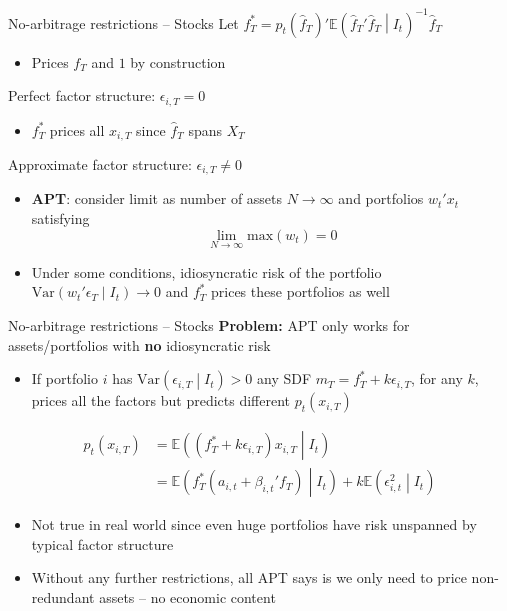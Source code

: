\documentclass[xcolor=table, aspectratio=169]{beamer}
\begin{document}
\begin{frame}{No-arbitrage restrictions -- Stocks}
Let $f_T^* = p_t(\hat{f}_T)' \mathbb{E} \left( \hat{f}_T'\hat{f}_T \middle\vert I_t \right)^{-1} \hat{f}_T$
\begin{itemize}
\item Prices $f_T$ and $1$ by construction
\end{itemize}
\vskip 8pt
Perfect factor structure: $\epsilon_{i,T} = 0$
\begin{itemize}
\item $f_T^*$ prices all $x_{i,T}$ since $\hat{f}_T$ spans $X_T$
\end{itemize}
\vskip 8pt
Approximate factor structure: $\epsilon_{i,T} \neq 0$
\begin{itemize}
\item \textbf{APT}: consider limit as number of assets $N \rightarrow \infty$ and portfolios $w_t'x_t$ satisfying
$$\lim_{N \rightarrow \infty} \text{max}(w_t) = 0$$
\item Under some conditions, idiosyncratic risk of the portfolio $\text{Var} \left( w_t'\epsilon_T  \middle\vert I_t \right) \rightarrow 0$ and $f_T^*$ prices these portfolios as well
\end{itemize}
\end{frame}

\begin{frame}{No-arbitrage restrictions -- Stocks}
\textbf{Problem:} APT only works for assets/portfolios with \textbf{no} idiosyncratic risk
\begin{itemize}
\item If portfolio $i$ has $\text{Var} \left( \epsilon_{i,T} \middle\vert I_t \right) > 0$ any SDF $m_T = f_T^* + k\epsilon_{i,T}$, for any $k$, prices all the factors but predicts different $p_t(x_{i,T})$
\end{itemize}
\begin{align*}
p_t(x_{i,T}) &= \mathbb{E} \left( (f_T^* + k \epsilon_{i,T}) x_{i,T} \middle\vert I_t \right) \\
&= \mathbb{E} \left( f_T^* (a_{i,t} + \beta_{i,t}'f_T) \middle\vert I_t \right) + k \mathbb{E} \left( \epsilon_{i,t}^2 \middle\vert I_t \right)
\end{align*}
\vskip -8pt
\begin{itemize}
\item Not true in real world since even huge portfolios have risk unspanned by typical factor structure
\item Without any further restrictions, all APT says is we only need to price non-redundant assets -- no economic content
\end{itemize}
\end{frame}
\end{document}
